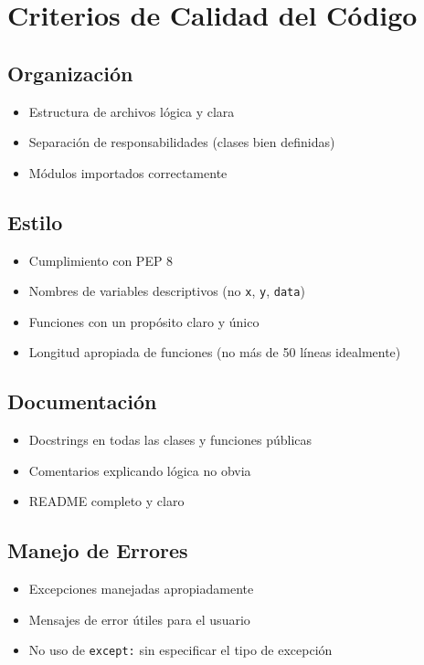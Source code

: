 \documentclass[12pt,a4paper]{article}
\begin{document}
\section{Criterios de Calidad del Código}

\subsection{Organización}
\begin{itemize}
    \item Estructura de archivos lógica y clara
    \item Separación de responsabilidades (clases bien definidas)
    \item Módulos importados correctamente
\end{itemize}

\subsection{Estilo}
\begin{itemize}
    \item Cumplimiento con PEP 8
    \item Nombres de variables descriptivos (no \texttt{x}, \texttt{y}, \texttt{data})
    \item Funciones con un propósito claro y único
    \item Longitud apropiada de funciones (no más de 50 líneas idealmente)
\end{itemize}

\subsection{Documentación}
\begin{itemize}
    \item Docstrings en todas las clases y funciones públicas
    \item Comentarios explicando lógica no obvia
    \item README completo y claro
\end{itemize}

\subsection{Manejo de Errores}
\begin{itemize}
    \item Excepciones manejadas apropiadamente
    \item Mensajes de error útiles para el usuario
    \item No uso de \texttt{except:} sin especificar el tipo de excepción
\end{itemize}
\end{document}
